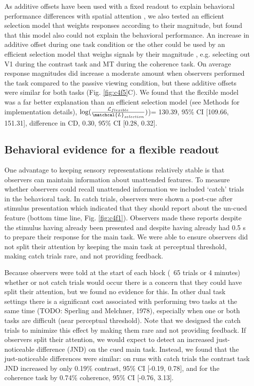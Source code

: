 \documentclass{report}
\begin{document}
As additive offsets have been used with a fixed readout to explain behavioral performance differences with spatial attention \citep{Pestilli2011-gi}, we also tested an efficient selection model that weights responses according to their magnitude, but found that this model also could not explain the behavioral performance. An increase in additive offset during one task condition or the other could be used by an efficient selection model that weighs signals by their magnitude \citep{Hara2014-mv,Pestilli2011-gi}, e.g. selecting out V1 during the contrast task and MT during the coherence task. On average response magnitudes did increase a moderate amount when observers performed the task compared to the passive viewing condition, but these additive offsets were similar for both tasks (Fig. \ref{fig:c4f5}C). We found that the flexible model was a far better explanation than an efficient selection model (see Methods for implementation details), $\log(\frac{\mathcal{L}_{flexible}}{\matchcal{L}_{selection}})$)= 130.39, 95\% CI [109.66, 151.31], difference in CD, 0.30, 95\% CI [0.28, 0.32]. 

\subsection{Behavioral evidence for a flexible readout}

One advantage to keeping sensory representations relatively stable is that observers can maintain information about unattended features. To measure whether observers could recall unattended information we included ‘catch’ trials in the behavioral task. In catch trials, observers were shown a post-cue after stimulus presentation which indicated that they should report about the un-cued feature (bottom time line, Fig. \ref{fig:c4f1}). Observers made these reports despite the stimulus having already been presented and despite having already had 0.5 s to prepare their response for the main task. We were able to ensure observers did not split their attention by keeping the main task at perceptual threshold, making catch trials rare, and not providing feedback.

Because observers were told at the start of each block (~65 trials or 4 minutes) whether or not catch trials would occur there is a concern that they could have split their attention, but we found no evidence for this. In other dual task settings there is a significant cost associated with performing two tasks at the same time (TODO: Sperling and Melchner, 1978), especially when one or both tasks are difficult (near perceptual threshold). Note that we designed the catch trials to minimize this effect by making them rare and not providing feedback. If observers split their attention, we would expect to detect an increased just-noticeable difference (JND) on the cued main task. Instead, we found that the just-noticeable differences were similar: on runs with catch trials the contrast task JND increased by only 0.19\% contrast, 95\% CI [-0.19, 0.78], and for the coherence task by 0.74\% coherence, 95\% CI [-0.76, 3.13].  
\end{document}
